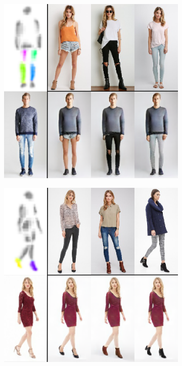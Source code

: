 \begin{figure}[t]
\begin{subfigure}{0.49\linewidth}
		\label{fig:part3_11}
		\end{subfigure}
		\begin{subfigure}{0.49\linewidth}
		\centering
		\includegraphics[trim={0cm 0cm 0cm 0cm},clip, width=1.\linewidth]{fig/part_legs}\caption{}
		\label{fig:part3_21}
		\end{subfigure}
		\begin{subfigure}{0.49\linewidth}
		\centering
		\includegraphics[trim={0cm 0cm 0cm 0cm},clip, width=1.\linewidth]{fig/part_shoe}\caption{}

\end{subfigure}
\end{figure}
